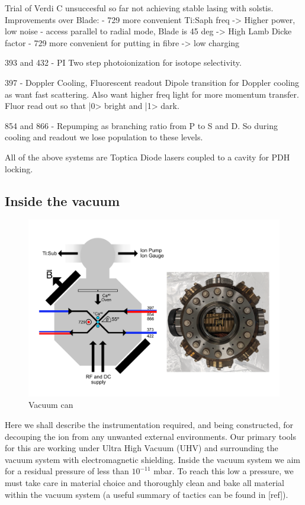 \documentclass[12pt]{iopart}
\begin{document}
Trial of Verdi C unsuccesful so far not achieving stable lasing with
solstis.
Improvements over Blade:
- 729 more convenient Ti:Saph freq -> Higher power, low noise
- access parallel to radial mode, Blade is 45 deg -> High Lamb Dicke
factor
- 729 more convenient for putting in fibre -> low charging


393 and 432 - PI 
Two step photoionization for isotope selectivity.

397 - Doppler Cooling, Fluorescent readout
Dipole transition for Doppler cooling as want fast scattering. Also
want higher freq light for more momentum transfer.
Fluor read out so that |0> bright and |1> dark.

854 and 866 - Repumping as branching ratio from P to S and D. So
during cooling and readout we lose population to these levels.

All of the above systems are Toptica Diode lasers coupled to a cavity
for PDH locking.


\subsection{Inside the vacuum}

\begin{figure}
  \begin{center}
   \noindent\includegraphics[width=\linewidth]{figures/vacuum_can.pdf}
  \end{center}
  \caption{Vacuum can}
  \label{fig:can}
\end{figure}

Here we shall describe the instrumentation required, and being
constructed, for decouping the ion from any unwanted external
environments. Our primary tools for this are working under Ultra High
Vacuum (UHV) and surrounding the vacuum system with electromagnetic
shielding. Inside the vacuum system we aim for a residual pressure of
less than $10^{-11}$ mbar. To reach this low a pressure, we must take
care in material choice and thoroughly clean and bake all material
within the vacuum system (a useful summary of tactics can be found in [ref]).
\end{document}
